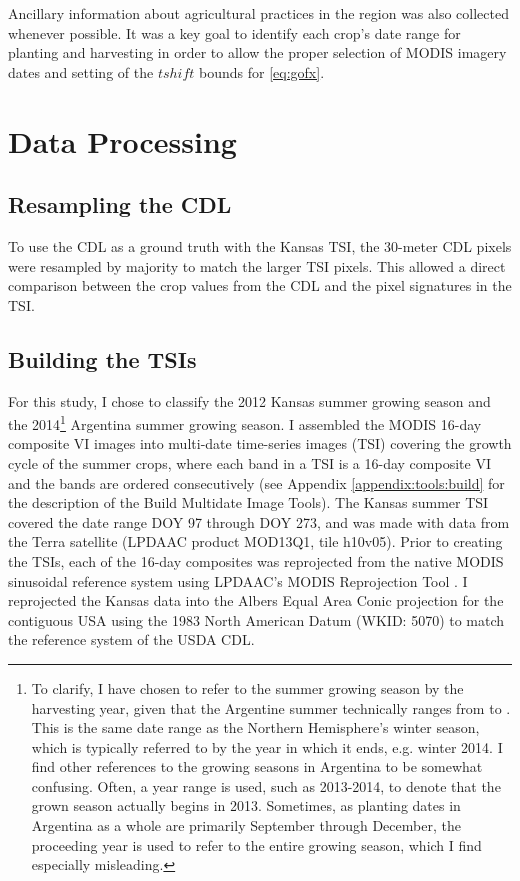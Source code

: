 Ancillary information about agricultural practices in the region was also collected whenever possible. It was a key goal to identify each crop's date range for planting and harvesting in order to allow the proper selection of MODIS imagery dates and setting of the $tshift$ bounds for \autoref{eq:gofx}.

\section{Data Processing}

\subsection{Resampling the CDL}

To use the CDL as a ground truth with the Kansas TSI, the 30-meter CDL pixels were resampled by majority to match the larger TSI pixels. This allowed a direct comparison between the crop values from the CDL and the pixel signatures in the TSI.

\subsection{Building the TSIs}

For this study, I chose to classify the 2012 Kansas summer growing season and the 2014\footnote{To clarify, I have chosen to refer to the summer growing season by the harvesting year, given that the Argentine summer technically ranges from  to . This is the same date range as the Northern Hemisphere's winter season, which is typically referred to by the year in which it ends, e.g. winter 2014. I find other references to the growing seasons in Argentina to be somewhat confusing. Often, a year range is used, such as 2013-2014, to denote that the grown season actually begins in 2013. Sometimes, as planting dates in Argentina as a whole are primarily September through December, the proceeding year is used to refer to the entire growing season, which I find especially misleading.} Argentina summer growing season. I assembled the MODIS 16-day composite VI images into multi-date time-series images (TSI) covering the growth cycle of the summer crops, where each band in a TSI is a 16-day composite VI and the bands are ordered consecutively (see Appendix \ref{appendix:tools:build} for the description of the Build Multidate Image Tools). The Kansas summer TSI covered the date range DOY 97 through DOY 273, and was made with data from the Terra satellite (LPDAAC product MOD13Q1, tile h10v05). Prior to creating the TSIs, each of the 16-day composites was reprojected from the native MODIS sinusoidal reference system using LPDAAC's MODIS Reprojection Tool \autocite{modis4.1}. I reprojected the Kansas data into the Albers Equal Area Conic projection for the contiguous USA using the 1983 North American Datum (WKID: 5070) to match the reference system of the USDA CDL.

